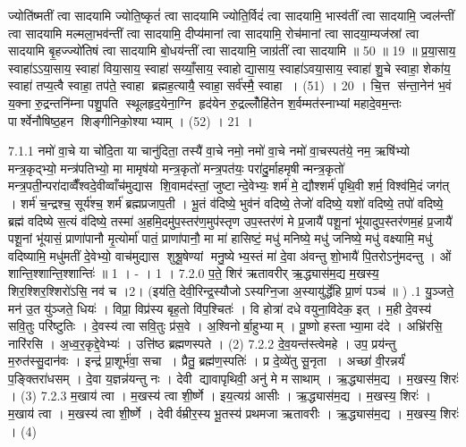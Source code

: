ज्योति॑ष्मतीं त्वा सादयामि ज्योति॒ष्कृतं॑ त्वा सादयामि ज्योति॒र्विदं॑ त्वा सादयामि॒ भास्व॑तीं त्वा सादयामि॒ ज्वल॑न्तीं त्वा सादयामि मल्मला॒भव॑न्तीं त्वा सादयामि॒ दीप्य॑मानां त्वा सादयामि॒ रोच॑मानां त्वा सादया॒म्यज॑स्रां त्वा सादयामि बृ॒हज्ज्यो॑तिषं त्वा सादयामि बो॒धय॑न्तीं त्वा सादयामि॒ जाग्र॑तीं त्वा सादयामि ॥ 50 ॥ 19 ॥
प्र॒या॒साय॒ स्वाहा॑ऽऽया॒साय॒ स्वाहा॑ विया॒साय॒ स्वाहा॑ सय्याँ॒साय॒ स्वाहोद्या॒साय॒ स्वाहा॑ऽवया॒साय॒ स्वाहा॑ शु॒चे स्वाहा॒ शेका॑य॒ स्वाहा॑ तप्य॒त्वै स्वाहा॒ तप॑ते॒ स्वाहा ब्रह्मह॒त्यायै॒ स्वाहा॒ सर्व॑स्मै॒ स्वाहा । (51) । 20 ।
चि॒त्त स॑न्ता॒नेन॑ भ॒वं य॒क्ना रु॒द्रन्तनि॑म्ना पशु॒पति स्थूलहृद॒येना॒ग्नि हृद॑येन रु॒द्रल्लोँहि॑तेन श॒र्वम्मत॑स्नाभ्यां महादे॒वम॒न्तः पार्श्वेनौषिष्ठ॒हन शिङ्गीनिको॒श्याभ्याम् । (52) । 21 ।
\anuvakamend

\setcounter{anuvakam}{0}
7.1.1
नमो॑ वा॒चे या चो॑दि॒ता या चानु॑दिता॒ तस्यै॑ वा॒चे नमो॒ नमो॑ वा॒चे नमो॑ वा॒चस्पत॑ये॒ नम॒ ऋषि॑भ्यो मन्त्र॒कृद्भ्यो॒ मन्त्र॑पतिभ्यो॒ मा मामृष॑यो मन्त्र॒कृतो॑ मन्त्र॒पत॑यः॒ परा॑दु॒र्माहमृषीन्मन्त्र॒कृतो॑ मन्त्र॒पती॒न्परा॑दाव्वैँश्वदे॒वीव्वाँच॑मुद्यास शि॒वामद॑स्तां॒ जुष्टान्दे॒वेभ्यः॒ शर्म॑ मे॒ द्यौश्शर्म॑ पृथि॒वी शर्म॒ विश्व॑मि॒दं जग॑त् । शर्म॑ च॒न्द्रश्च॒ सूर्य॑श्च॒ शर्म॑ ब्रह्मप्रजाप॒ती । भू॒तं व॑दिष्ये॒ भुव॑नं वदिष्ये॒ तेजो॑ वदिष्ये॒ यशो॑ वदिष्ये॒ तपो॑ वदिष्ये॒ ब्रह्म॑ वदिष्ये स॒त्यं व॑दिष्ये॒ तस्मा॑ अ॒हमि॒दमु॑प॒स्तर॑ण॒मुप॑स्तृण उप॒स्तर॑णं मे प्र॒जायै॑ पशू॒नां भू॑यादुप॒स्तर॑णम॒हं प्र॒जायै॑ पशू॒नां भू॑यासं॒ प्राणा॑पानौ मृ॒त्योर्मा॑ पातं॒ प्राणा॑पानौ॒ मा मा॑ हासिष्टं॒ मधु॑ मनिष्ये॒ मधु॑ जनिष्ये॒ मधु॑ वक्ष्यामि॒ मधु॑ वदिष्यामि॒ मधु॑मतीं दे॒वेभ्यो॒ वाच॑मुद्यास शुश्रू॒षेण्यां मनु॒ष्येभ्य॒स्तं मा॑ दे॒वा अ॑वन्तु शो॒भायै॑ पि॒तरोऽनु॑मदन्तु । ओं शान्ति॒श्शान्ति॒श्शान्तिः॑ ॥ 1 । - । 1 ।
7.2.0
प॒ते॒ शिर॑ ऋतावरीर् ऋ॒द्ध्यास॑म॒द्य म॒खस्य॒ शिर॒श्शिर॒श्शिरो॑ऽसि॒ नव॑ च ।2। (इय॑ति॒ देवी॒रिन्द्र॒स्यौजोऽस्यग्नि॒जा अ॒स्यायु॑र्द्धेहि प्रा॒णं पञ्च॑ ॥ )
.1
यु॒ञ्जते॒ मन॑ उ॒त यु॑ञ्जते॒ धियः॑ । विप्रा॒ विप्र॑स्य बृह॒तो वि॑प॒श्चितः॑ । वि होत्रा॑ दधे वयुना॒विदेक॒ इत् । म॒ही दे॒वस्य॑ सवि॒तुः परि॑ष्टुतिः । दे॒वस्य॑ त्वा सवि॒तुः प्र॑स॒वे । अ॒श्विनोर्बा॒हुभ्याम् । पू॒ष्णो हस्ताभ्या॒मा द॑दे । अभ्रि॑रसि॒ नारि॑रसि । अ॒ध्व॒र॒कृद्दे॒वेभ्यः॑ । उत्ति॑ष्ठ ब्रह्मणस्पते । (2)
7.2.2
दे॒व॒यन्त॑स्त्वेमहे । उप॒ प्रय॑न्तु म॒रुत॑स्सु॒दान॑वः । इन्द्र॑ प्रा॒शूर्भ॑वा॒ सचा । प्रैतु॒ ब्रह्म॑ण॒स्पतिः॑ । प्र दे॒व्ये॑तु सू॒नृता । अच्छा॑ वी॒रन्नर्यं॑ प॒ङ्क्तिरा॑धसम् । दे॒वा य॒ज्ञन्न॑यन्तु नः । देवी द्यावापृथिवी॒ अनु॑ मे मसाथाम् । ऋ॒द्ध्यास॑म॒द्य । म॒खस्य॒ शिरः॑ । (3)
7.2.3
म॒खाय॑ त्वा । म॒खस्य॑ त्वा शी॒र्ष्णे । इय॒त्यग्र॑ आसीः । ऋ॒द्ध्यास॑म॒द्य । म॒खस्य॒ शिरः॑ । म॒खाय॑ त्वा । म॒खस्य॑ त्वा शी॒र्ष्णे । देवीर्वम्रीर॒स्य भू॒तस्य॑ प्रथमजा ऋतावरीः । ऋ॒द्ध्यास॑म॒द्य । म॒खस्य॒ शिरः॑ । (4)
